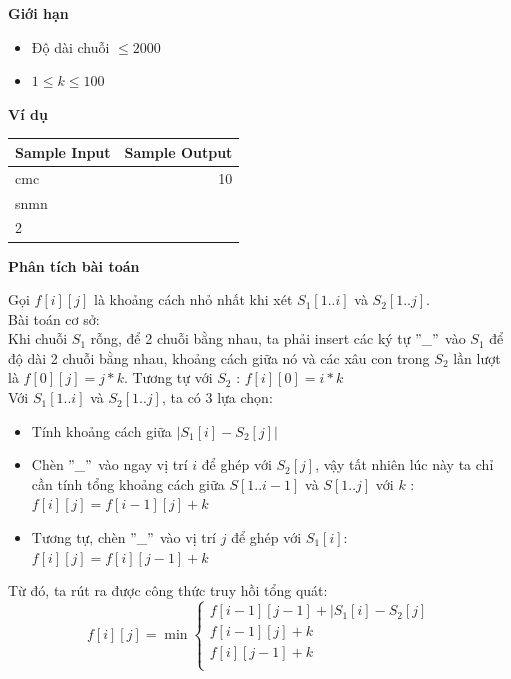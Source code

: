 \documentclass{article}
\begin{document}
\textbf{Giới hạn}
\begin{itemize}
    \item Độ dài chuỗi $\leq 2000$
    \item $1 \leq k \leq 100$
\end{itemize}

\textbf{Ví dụ}

\begin{table}[h]
    \centering
    \begin{tabular}{|l|r|}
        \hline
        \textbf{Sample Input} & \textbf{Sample Output} \\
        \hline
		cmc& 10\\ 
		snmn&  \\
        2 & \\ 
		\hline
    \end{tabular}
\end{table}

\textbf{Phân tích bài toán}

Gọi $f[i][j]$ là khoảng cách nhỏ nhất khi xét $S_1[1..i]$ và $S_2[1..j]$. \\

Bài toán cơ sở: \\

Khi chuỗi $S_1$ rỗng, để 2 chuỗi bằng nhau, ta phải insert các ký tự $"\_"$ vào $S_1$ để độ dài 2 chuỗi bằng nhau, khoảng cách giữa nó và các xâu con trong $S_2$ lần lượt là $f[0][j] = j * k$. Tương tự với $S_2$ : $f[i][0] = i * k$ \\

Với $S_1[1..i]$ và $S_2[1..j]$, ta có 3 lựa chọn: 
\begin{itemize}
    \item Tính khoảng cách giữa $|S_1[i] - S_2[j]|$
    \item Chèn $"\_"$ vào ngay vị trí $i$ để ghép với $S_2[j]$, vậy tất nhiên lúc này ta chỉ cần tính tổng khoảng cách giữa $S[1..i-1]$ và $S[1..j]$ với $k$ : $f[i][j] = f[i - 1][j] + k$
    \item Tương tự, chèn $"\_"$ vào vị trí $j$ để ghép với $S_1[i]$: $f[i][j] = f[i][j - 1] + k$
\end{itemize}

Từ đó, ta rút ra được công thức truy hồi tổng quát:
\[
f[i][j] = \min
\begin{cases}
    f[i - 1][j - 1] + |S_1[i] - S_2[j] \\
    f[i - 1][j] + k \\
    f[i][j - 1] + k \\
\end{cases}
\]
\end{document}
